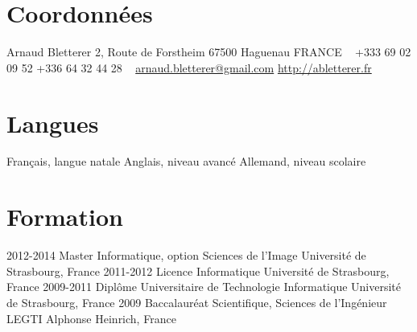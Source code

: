 \documentclass[]{friggeri-cv} %
\begin{document}


\begin{aside} %

\section{Coordonnées}
Arnaud Bletterer
2, Route de Forstheim
67500 Haguenau
FRANCE
~
+333 69 02 09 52
+336 64 32 44 28
~
\href{mailto:arnaud.bletterer@gmail.com}{arnaud.bletterer@gmail.com}
\href{http://abletterer.fr}{http://abletterer.fr}
\section{Langues}
Français, langue natale
Anglais, niveau avancé
Allemand, niveau scolaire
\end{aside}

\section{Formation}

\begin{entrylist}
\myentry
{2012-2014}
{Master {\normalfont Informatique, option Sciences de l'Image}}
{Université de Strasbourg, France}
\myentry
{2011-2012}
{Licence {\normalfont Informatique}}
{Université de Strasbourg, France}
\myentry
{2009-2011}
{Diplôme Universitaire de Technologie {\normalfont Informatique}}
{Université de Strasbourg, France}
\myentry
{2009}
{Baccalauréat {\normalfont Scientifique, Sciences de l'Ingénieur}}
{LEGTI Alphonse Heinrich, France}
\end{entrylist}

\end{document}
